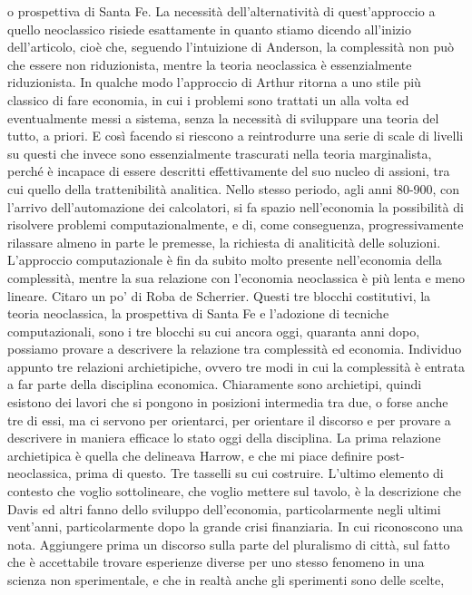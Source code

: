 \documentclass[a4paper, headings=standardclasses]{scrartcl}
\begin{document}
o prospettiva di Santa Fe. La necessità dell'alternatività di quest'approccio a quello neoclassico risiede
esattamente in quanto stiamo dicendo all'inizio dell'articolo, cioè che, seguendo l'intuizione
di Anderson, la complessità non può che essere non riduzionista, mentre la teoria neoclassica è essenzialmente riduzionista.
In qualche modo l'approccio di Arthur ritorna a uno stile più classico di fare economia,
in cui i problemi sono trattati un alla volta ed eventualmente messi a sistema, senza la
necessità di sviluppare una teoria del tutto, a priori. E così facendo si riescono a reintrodurre
una serie di scale di livelli su questi che invece sono essenzialmente trascurati nella
teoria marginalista, perché è incapace di essere descritti effettivamente del suo nucleo di assioni,
tra cui quello della trattenibilità analitica. Nello stesso periodo, agli anni 80-900, con l'arrivo
dell'automazione dei calcolatori, si fa spazio nell'economia la possibilità di risolvere problemi
computazionalmente, e di, come conseguenza, progressivamente rilassare almeno in parte
le premesse, la richiesta di analiticità delle soluzioni. L'approccio computazionale è fin da subito molto presente
nell'economia della complessità, mentre la sua relazione con l'economia neoclassica è più lenta e meno lineare.
Citaro un po' di Roba de Scherrier.
Questi tre blocchi costitutivi, la teoria neoclassica, la prospettiva di Santa Fe e l'adozione di tecniche
computazionali, sono i tre blocchi su cui ancora oggi, quaranta anni dopo, possiamo provare a descrivere
la relazione tra complessità ed economia.
Individuo appunto tre relazioni archietipiche, ovvero tre modi in cui la complessità è entrata a far parte
della disciplina economica. Chiaramente sono archietipi, quindi esistono dei lavori che si pongono in posizioni
intermedia tra due, o forse anche tre di essi, ma ci servono per orientarci, per orientare il discorso
e per provare a descrivere in maniera efficace lo stato oggi della disciplina.
La prima relazione archietipica è quella che delineava Harrow, e che mi piace definire post-neoclassica, prima di questo.
Tre tasselli su cui costruire.
L'ultimo elemento di contesto che voglio sottolineare, che voglio mettere sul tavolo, è la descrizione che Davis ed altri
fanno dello sviluppo dell'economia, particolarmente negli ultimi vent'anni, particolarmente dopo la grande crisi finanziaria.
In cui riconoscono una nota.
Aggiungere prima un discorso sulla parte del pluralismo di città, sul fatto che è accettabile trovare esperienze diverse
per uno stesso fenomeno in una scienza non sperimentale, e che in realtà anche gli sperimenti sono delle scelte,
\end{document}
